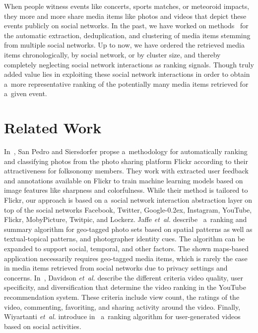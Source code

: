 \documentclass{sig-alternate}
\DeclareRobustCommand{\googleplus}{\mbox{Google\hspace{0em}\raisebox{.28ex}{\tiny\bf +}\kern-0.2ex}\xspace}
\begin{document}
When people witness events like concerts, sports matches, or meteoroid impacts,
they more and more share media items like photos and videos
that depict these events publicly on social networks.
In the past, we have worked on methods~%
\cite{khrouf2012aggregatingsocialmedia,rizzo2012whatfresh}
for the automatic extraction, deduplication, and clustering of media items
stemming from multiple social networks.
Up to now, we have ordered the retrieved media items chronologically,
by social network, or by cluster size, and thereby completely neglecting
social network interactions as ranking signals.
Though truly added value lies in exploiting these social network interactions
in order to obtain a~more representative ranking of the
potentially many media items retrieved for a~given event.

\section{Related Work}

In~\cite{sanpedro2009ranking}, San Pedro and Siersdorfer propse a~methodology
for automatically ranking and classifying photos from the photo sharing platform Flickr
according to their attractiveness for folksonomy members.
They work with extracted user feedback and annotations available on Flickr
to train machine learning models based on
image features like sharpness and colorfulness.
While their method is tailored to Flickr,
our approach is based on a~social network interaction abstraction layer
on top of the social networks Facebook, Twitter, \googleplus, Instagram,
YouTube, Flickr, MobyPicture, Twitpic, and Lockerz.
Jaffe \emph{et~al.} describe~\cite{jaffe2006generatingsummaries} 
a~ranking and summary algorithm for geo-tagged photo sets based on spatial patterns
as well as textual-topical patterns, and photographer identity cues.
The algorithm can be expanded to support social, temporal, and other factors.
The shown maps-based application necessarily requires geo-tagged media items,
which is rarely the case in media items retrieved from social networks
due to privacy settings and concerns. 
In~\cite{davidson2010youtube}, Davidson \emph{et~al.} describe the different criteria
video quality, user specificity, and diversification
that determine the video ranking in the YouTube recommendation system.
These criteria include view count, the ratings of the video, commenting, favoriting,
and sharing activity around the video.
Finally, Wiyartanti \emph{et~al.} introduce in~\cite{wiyartanti2008ranking}
a~ranking algorithm for user-generated videos based on social activities.
\end{document}

